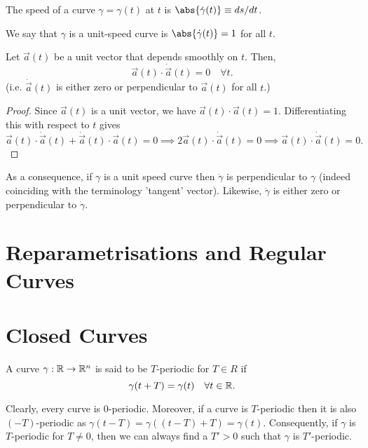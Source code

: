 \documentclass[11pt]{penrose}
\begin{document}
\begin{ndfn}
    The speed of a curve $\gamma = \gamma(t)$ at $t$ is $\abs{\dot{\gamma}(t)} \equiv ds/dt$.

    We say that $\gamma$ is a unit-speed curve is $\abs{\dot{\gamma}(t)} = 1$ for all $t$.
\end{ndfn}

\begin{nprop}
    Let $\vec{a}(t)$ be a unit vector that depends smoothly on $t$. Then,
    \begin{equation}
        \vec{a}(t) \cdot \dot{\vec{a}}(t) = 0
        \quad\forall t.
    \end{equation}
    (i.e. $\dot{\vec{a}}(t)$ is either zero or perpendicular to $\vec{a}(t)$ for all $t$.)
\end{nprop}
\begin{proof}
    Since $\vec{a}(t)$ is a unit vector, we have $\vec{a}(t) \cdot \vec{a}(t) = 1$. Differentiating this with respect to $t$ gives
    \begin{equation}
        \vec{a}(t) \cdot \dot{\vec{a}}(t) + \dot{\vec{a}}(t) \cdot \vec{a}(t) = 0
        \implies
        2 \vec{a}(t) \cdot \dot{\vec{a}}(t) = 0
        \implies
        \vec{a}(t) \cdot \dot{\vec{a}}(t) = 0.
    \end{equation}
\end{proof}

As a consequence, if $\gamma$ is a unit speed curve then $\dot{\gamma}$ is perpendicular to $\gamma$ (indeed coinciding with the terminology 'tangent' vector). Likewise, $\ddot{\gamma}$ is either zero or perpendicular to $\dot{\gamma}$.

\section{Reparametrisations and Regular Curves}

\section{Closed Curves}
\begin{ndfn}
    A curve $\gamma : \mathbb{R} \to \mathbb{R}^n$ is said to be $T$-periodic for $T \in R$ if
    \begin{equation}
        \gamma(t + T) = \gamma(t)
        \quad\forall t \in \mathbb{R}.
    \end{equation}
\end{ndfn}

Clearly, every curve is $0$-periodic. Moreover, if a curve is $T$-periodic then it is also $(-T)$-periodic as $\gamma(t - T) = \gamma((t-T) + T) = \gamma(t)$. Consequently, if $\gamma$ is $T$-periodic for $T \neq 0$, then we can always find a $T' > 0$ such that $\gamma$ is $T'$-periodic.
\end{document}
